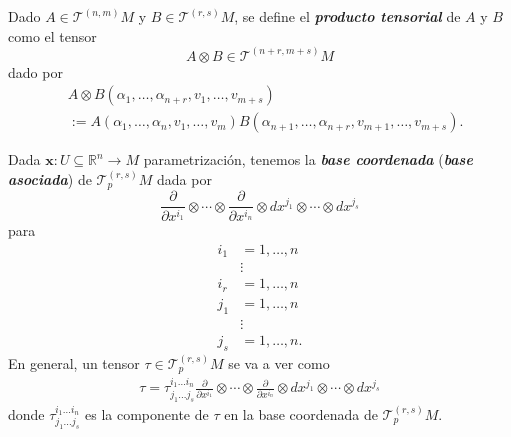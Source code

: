 \begin{definition}
Dado $A\in\mathcal{T}^{(n,m)}M$ y $B\in\mathcal{T}^{(r,s)}M$, se define el \textit{\textbf{producto tensorial}} de $A$ y $B$ como el tensor 
\begin{equation*}
    A\otimes B\in\mathcal{T}^{(n+r,m+s)}M
\end{equation*}
dado por 
\begin{align*}
    &A\otimes B(\alpha_1,\dots,\alpha_{n+r},v_1,\dots,v_{m+s})\\
    &:=A(\alpha_1,\dots,\alpha_n,v_1,\dots,v_m)B(\alpha_{n+1},\dots,\alpha_{n+r},v_{m+1},\dots,v_{m+s}).
\end{align*}
\end{definition}

\begin{observation}
Dada $\mathbf{x}\colon U\subseteq\mathbb{R}^n\to M$ parametrizaci\'on, tenemos la \textit{\textbf{base coordenada}} (\textit{\textbf{base asociada}}) de $\mathcal{T}_p^{(r,s)}M$ dada por
\begin{equation*}
    \frac{\partial}{\partial x^{i_1}}\otimes\cdots\otimes\frac{\partial}{\partial x^{i_n}}\otimes dx^{j_1}\otimes\cdots\otimes dx^{j_s}
\end{equation*}
para 
\begin{align*}
    i_1&=1,\dots,n\\
    &\vdots\\
    i_r&=1,\dots,n\\
    j_1&=1,\dots,n\\
    &\vdots\\
    j_s&=1,\dots,n.
\end{align*}
En general, un tensor $\tau\in\mathcal{T}_p^{(r,s)}M$ se va a ver como 
\begin{align*}
    \tau=\tau^{i_1\dots i_n}_{j_1\dots j_s}    \frac{\partial}{\partial x^{i_1}}\otimes\cdots\otimes\frac{\partial}{\partial x^{i_n}}\otimes dx^{j_1}\otimes\cdots\otimes dx^{j_s}
\end{align*}
donde $\tau^{i_1\dots i_n}_{j_1\dots j_s}$ es la componente de $\tau$ en la base coordenada de $\mathcal{T}_p^{(r,s)}M$.
\end{observation}

